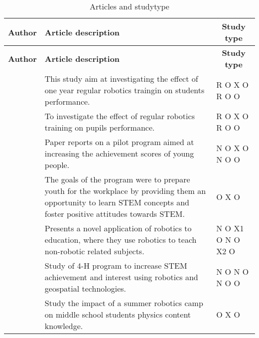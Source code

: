 \setlength\LTleft{0px}
\setlength\LTright{0px}
\begin{longtable}{@{\extracolsep{\fill}}p{}p{}p{}}
	\hline \multicolumn{1}{l}{\textbf{Author}} & \multicolumn{1}{l}{\textbf{Article description}} & \multicolumn{1}{c}{\textbf{Study type	}} \\ \hline\hline
	\endfirsthead
	
	\hline
	\multicolumn{1}{l}{\textbf{Author}} & \multicolumn{1}{l}{\textbf{Article description}} & \multicolumn{1}{c}{\textbf{Study type	}} \\ \hline\hline
	\endhead
	
	\hline
	\caption{Articles and studytype}
	\label{tab:type}
	\endlastfoot
	\tcite{hussain2006effect} & This study aim at investigating the effect of one year regular robotics traingin on students performance. & R O X O R O O\\\hline
	\tcite{lindh2007does} & To investigate the effect of regular robotics training on pupils performance. & R O X O R O O\\\hline
	\tcite{barker2007robotics}& Paper reports on a pilot program aimed at increasing the achievement scores of young people. & N O X O N O O\\\hline
	\tcite{nugent2009use} & The goals of the program were to prepare youth for the workplace by providing them an opportunity to learn STEM concepts and foster positive attitudes towards STEM. & O X O\\\hline
	\tcite{mitnik2008autonomous} & Presents a novel application of robotics to education, where they use robotics to teach non-robotic related subjects. & N O X1 O N O X2 O\\\hline
	\tcite{nugent2008effect} & Study of 4-H program to increase STEM achievement and interest using robotics and geospatial technologies. & N O N O N O O\\\hline
	\tcite{williams2007acquisition} & Study the impact of a summer robotics camp on middle school students physics content knowledge.  & O X O\\\hline
\end{longtable}

